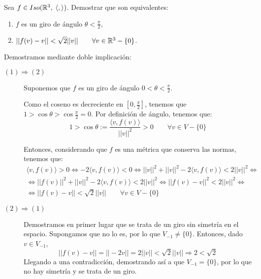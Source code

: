\begin{ejercicio}
    Sea $f\in Iso(\mathbb{R}^3,\; \langle,\rangle)$. Demostrar que son equivalentes:
    \begin{enumerate}
        \item $f$ es un giro de ángulo $\theta < \frac{\pi}{2}$,
        \item $||f(v)-v|| < \sqrt{2}||v|| \qquad \forall v\in \mathbb{R}^3-\{0\}$.
    \end{enumerate}


    Demostramos mediante doble implicación:
    \begin{description}
        \item [$(1) \Longrightarrow (2)$]
         Suponemos que $f$ es un giro de ángulo $0 < \theta < \frac{\pi}{2}$.
         
         Como el coseno es decreciente en $\left[0,\frac{\pi}{2}\right]$, tenemos que $1 > \cos \theta > \cos \frac{\pi}{2}=0$. Por definición de ángulo, tenemos que:
         \begin{equation*}
             1 > \cos \theta := \frac{\langle v,f(v)\rangle}{||v||^2} > 0 \qquad \forall v\in V-\{0\}
         \end{equation*}

         Entonces, considerando que $f$ es una métrica que conserva las normas, tenemos que:
         \begin{multline*}
             \langle v,f(v)\rangle > 0
             \Longleftrightarrow
             -2\langle v,f(v)\rangle < 0
             \Longleftrightarrow
             ||v||^2 + ||v||^2 -2\langle v,f(v)\rangle < 2||v||^2
             \Longleftrightarrow \\ \Longleftrightarrow
             ||f(v)||^2 + ||v||^2 -2\langle v,f(v)\rangle < 2||v||^2
             \Longleftrightarrow
             ||f(v)-v||^2 < 2||v||^2
             \Longleftrightarrow \\ \Longleftrightarrow
             ||f(v)-v|| < \sqrt{2}||v|| \qquad \forall v\in V-\{0\}
         \end{multline*}
        
        
        \item [$(2) \Longrightarrow (1)$]

        Demostramos en primer lugar que se trata de un giro sin simetría en el espacio. Supongamos que no lo es, por lo que $V_{-1}\neq \{0\}$. Entonces, dado $v\in V_{-1}$,
        \begin{equation*}
            ||f(v)-v|| = ||-2v|| = 2||v|| < \sqrt{2}||v|| \Longrightarrow 2 < \sqrt{2}
        \end{equation*}
        Llegando a una contradicción, demostrando así a que $V_{-1}=\{0\}$, por lo que no hay simetría y se trata de un giro.


\end{description}
\end{ejercicio}
